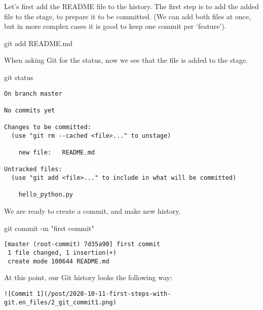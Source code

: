 \documentclass[]{article}
\newenvironment{Shaded}{\begin{snugshade}}{\end{snugshade}}
\newcommand{\FunctionTok}[1]{\textcolor[rgb]{0.00,0.00,0.00}{#1}}
\newcommand{\NormalTok}[1]{#1}
\newcommand{\StringTok}[1]{\textcolor[rgb]{0.31,0.60,0.02}{#1}}
\begin{document}
Let's first add the README file to the history. The first step is to add
the added file to the stage, to prepare it to be committed. (We can add
both files at once, but in more complex cases it is good to keep one
commit per `feature').

\begin{Shaded}
\begin{Highlighting}[]
\FunctionTok{git}\NormalTok{ add README.md}
\end{Highlighting}
\end{Shaded}

When asking Git for the status, now we see that the file is added to the
stage.

\begin{Shaded}
\begin{Highlighting}[]
\FunctionTok{git}\NormalTok{ status}
\end{Highlighting}
\end{Shaded}

\begin{verbatim}
On branch master

No commits yet

Changes to be committed:
  (use "git rm --cached <file>..." to unstage)

    new file:   README.md

Untracked files:
  (use "git add <file>..." to include in what will be committed)

    hello_python.py
\end{verbatim}

We are ready to create a commit, and make new history.

\begin{Shaded}
\begin{Highlighting}[]
\FunctionTok{git}\NormalTok{ commit -m }\StringTok{"first commit"}
\end{Highlighting}
\end{Shaded}

\begin{verbatim}
[master (root-commit) 7d35a90] first commit
 1 file changed, 1 insertion(+)
 create mode 100644 README.md
\end{verbatim}

At this point, our Git history looks the following way:

\begin{verbatim}
![Commit 1](/post/2020-10-11-first-steps-with-git.en_files/2_git_commit1.png)
\end{verbatim}
\end{document}
